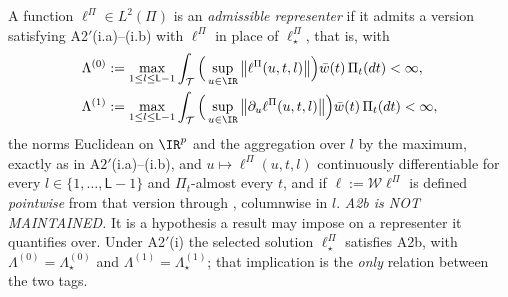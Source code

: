 \begin{assumption}\label{ass:admrep}
A function $\ell^\Pi\in L^{2}(\Pi)$ is an \emph{admissible representer} if it admits a version satisfying
A2$'$(i.a)--(i.b) with $\ell^\Pi$ in place of $\ell^\Pi_\star$, that is, with
\[
\begin{aligned}
\Lambda^{(0)}&:=\max_{1\le l\le\mathsf L-1}\int_{\mathcal T}\Big(\sup_{u\in\IR}\big\|\ell^\Pi(u,t,l)\big\|\Big)\bar w(t)\,\Pi_t(dt)<\infty,\\
\Lambda^{(1)}&:=\max_{1\le l\le\mathsf L-1}\int_{\mathcal T}\Big(\sup_{u\in\IR}\big\|\partial_u\ell^\Pi(u,t,l)\big\|\Big)\bar w(t)\,\Pi_t(dt)<\infty,
\end{aligned}
\]
the norms Euclidean on $\IR^{p}$ and the aggregation over $l$ by the maximum, exactly as in
A$2'$(i.a)--(i.b),
and $u\mapsto\ell^\Pi(u,t,l)$ continuously differentiable for every $l\in\{1,\dots,\mathsf L-1\}$ and
$\Pi_t$-almost every $t$, and if
$\ell:=\mathcal W\ell^\Pi$ is defined \emph{pointwise} from that version through ,
columnwise in $l$.
\emph{A2b is NOT MAINTAINED.} It is a hypothesis a result may impose on a representer it
quantifies over. Under A2$'$(i) the selected solution $\ell^\Pi_\star$ satisfies
A2b, with $\Lambda^{(0)}=\Lambda^{(0)}_\star$ and $\Lambda^{(1)}=\Lambda^{(1)}_\star$; that
implication is the \emph{only} relation between the two tags.
\end{assumption}

